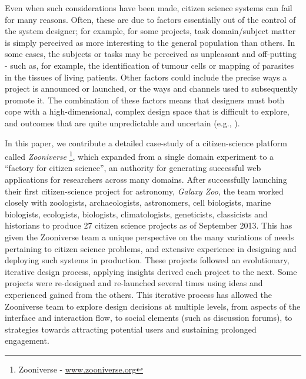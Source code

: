 \documentclass{sigchi}
\begin{document}
Even when such considerations have been made, citizen science systems can fail for many reasons.  Often, these are due to factors essentially out of the control of the system designer; for example, for some projects, task domain/subject matter is simply  perceived as more interesting to the general population than others.  In some cases, the subjects or tasks may be perceived as unpleasant and off-putting - such as, for example, the identification of tumour cells or mapping of parasites in the tissues of living patients.  Other factors could include the precise ways a project is announced or launched, or the ways and channels used to subsequently promote it.  The combination of these factors means that designers must both cope with a high-dimensional, complex design space that is difficult to explore, and outcomes that are quite unpredictable and uncertain (e.g., \cite{bentham, museums, beamartian}).




In this paper, we contribute a detailed case-study of a citizen-science platform called \emph{Zooniverse} \footnote{Zooniverse - \url{www.zooniverse.org}}, which expanded from a single domain experiment to a  ``factory for citizen science'', an authority for generating successful web applications for researchers across many domains.  After successfully launching their first citizen-science project for astronomy, \emph{Galaxy Zoo}, the team worked closely with zoologists, archaeologists, astronomers, cell biologists, marine biologists, ecologists, biologists, climatologists, geneticists, classicists and historians to produce 27 citizen science projects as of September 2013.  This has given the Zooniverse team a unique perspective on the many variations of needs pertaining to citizen science problems, and extensive experience in designing and deploying such systems in production. These projects followed an evolutionary, iterative design process, applying insights derived each project to the next.  Some projects were re-designed and re-launched several times using ideas and experienced gained from the others.   This iterative process has allowed the Zooniverse team to explore design decisions at multiple levels, from aspects of the interface and interaction flow, to social elements (such as discussion forums), to strategies towards attracting potential users and sustaining prolonged engagement. 
\end{document}

